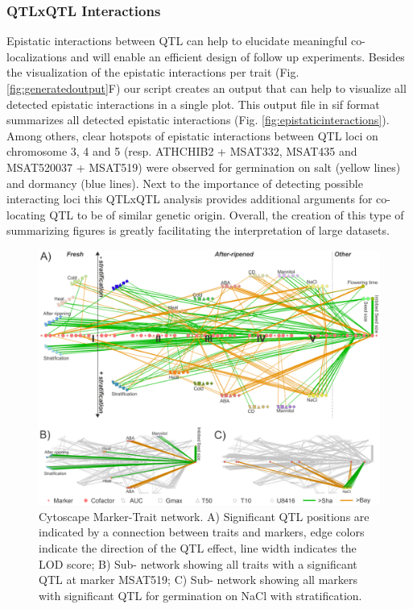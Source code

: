 \subsubsection{QTLxQTL Interactions}
Epistatic interactions between QTL can help to elucidate meaningful co-localizations and will enable an 
efficient design of follow up experiments. Besides the visualization of the epistatic interactions per 
trait (Fig. \ref{fig:generatedoutput}F) our script creates an output that can help to visualize all detected epistatic 
interactions in a single plot. This output file in sif format summarizes all detected epistatic 
interactions (Fig. \ref{fig:epistaticinteractions}). Among others, clear hotspots of 
epistatic interactions between QTL loci on chromosome 3, 4 and 5 (resp. ATHCHIB2 + MSAT332, MSAT435 and 
MSAT520037 + MSAT519) were observed for germination on salt (yellow lines) and dormancy (blue lines). 
Next to the importance of detecting possible interacting loci this QTLxQTL analysis provides additional 
arguments for co-locating QTL to be of similar genetic origin. Overall, the creation of this type of 
summarizing figures is greatly facilitating the interpretation of large datasets.

\begin{figure}[h!]
  \centering
  \includegraphics[keepaspectratio,scale=0.30]{eps/image_3_1_5.eps}
  \caption[Cytoscape marker trait network.]{Cytoscape Marker-Trait network. A) Significant QTL positions are 
          indicated by a connection between traits and markers, edge colors indicate the direction of the QTL 
          effect, line width indicates the LOD score; B) Sub- network showing all traits with a significant 
          QTL at marker MSAT519; C) Sub- network showing all markers with significant QTL for germination on 
          NaCl with stratification.}
\end{figure}

